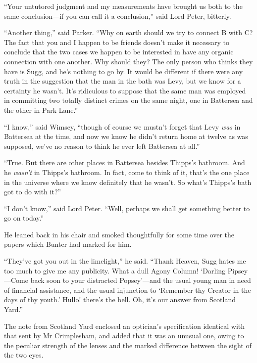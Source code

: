 \enquote{Your untutored judgment and my measurements have brought us both to the same conclusion\allowbreak---\allowbreak if you can call it a conclusion,} said Lord Peter, bitterly.

\enquote{Another thing,} said Parker. \enquote{Why on earth should we try to connect \textsc{B} with \textsc{C}? The fact that you and I happen to be friends doesn’t make it necessary to conclude that the two cases we happen to be interested in have any organic connection with one another. Why should they? The only person who thinks they have is Sugg, and he’s nothing to go by. It would be different if there were any truth in the suggestion that the man in the bath was Levy, but we know for a certainty he wasn’t. It’s ridiculous to suppose that the same man was employed in committing two totally distinct crimes on the same night, one in Battersea and the other in Park Lane.}

\enquote{I know,} said Wimsey, \enquote{though of course we mustn’t forget that Levy \textit{was} in Battersea at the time, and now we know he didn’t return home at twelve as was supposed, we’ve no reason to think he ever left Battersea at all.}

\enquote{True. But there are other places in Battersea besides Thipps’s bathroom. And he \textit{wasn’t} in Thipps’s bathroom. In fact, come to think of it, that’s the one place in the universe where we know definitely that he wasn’t. So what’s Thipps’s bath got to do with it?}

\enquote{I don’t know,} said Lord Peter. \enquote{Well, perhaps we shall get something better to go on today.}

He leaned back in his chair and smoked thoughtfully for some time over the papers which Bunter had marked for him.

\enquote{They’ve got you out in the limelight,} he said. \enquote{Thank Heaven, Sugg hates me too much to give me any publicity. What a dull Agony Column! \enquote{Darling Pipsey\allowbreak---\allowbreak Come back soon to your distracted Popsey}---and the usual young man in need of financial assistance, and the usual injunction to \enquote{Remember thy Creator in the days of thy youth.} Hullo! there’s the bell. Oh, it’s our answer from Scotland Yard.}

The note from Scotland Yard enclosed an optician’s specification identical with that sent by Mr Crimplesham, and added that it was an unusual one, owing to the peculiar strength of the lenses and the marked difference between the sight of the two eyes.

